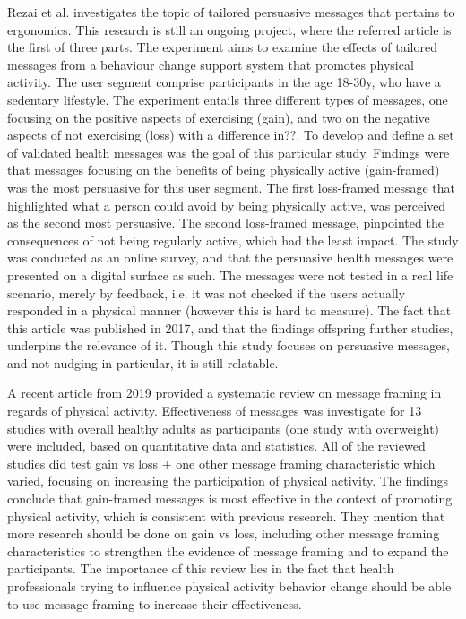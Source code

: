 Rezai et al.
investigates the topic of tailored persuasive messages that pertains to ergonomics. This research is still an ongoing project, where the referred article is the first of three parts. The experiment aims to examine the effects of tailored messages from a behaviour change support system that promotes physical activity. The user segment comprise participants in the age 18-30y, who have a sedentary lifestyle. The experiment entails three different types of messages, one focusing on the positive aspects of exercising (gain), and two on the negative aspects of not exercising (loss) with a difference in??. To develop and define a set of validated health messages was the goal of this particular study. Findings were that messages focusing on the benefits of being physically active (gain-framed) was the most persuasive for this user segment. The first loss-framed message that highlighted what a person could avoid by being physically active, was perceived as the second most persuasive. The second loss-framed message, pinpointed the consequences of not being regularly active, which had the least impact. The study was conducted as an online survey, and that the persuasive health messages were presented on a digital surface as such. The messages were not tested in a real life scenario, merely by feedback, i.e. it was not checked if the users actually responded in a physical manner (however this is hard to measure). The fact that this article was published in 2017, and that the findings offspring further studies, underpins the relevance of it. Though this study focuses on persuasive messages, and not nudging in particular, it is still relatable.

A recent article from 2019 
\cite{williams_effects_2019}
provided a systematic review on message framing in regards of physical activity. Effectiveness of messages was investigate for 13 studies with overall healthy adults as participants (one study with overweight) were included, based on quantitative data and statistics. All of the reviewed studies did test gain vs loss + one other message framing characteristic which varied, focusing on increasing the participation of physical activity. The findings conclude that gain-framed messages is most effective in the context of promoting physical activity, which is consistent with previous research. They mention that more research should be done on gain vs loss, including other message framing characteristics to strengthen the evidence of message framing and to expand the participants.
The importance of this review lies in the fact that health professionals trying to influence physical activity behavior change should be able to use message framing to increase their effectiveness.

